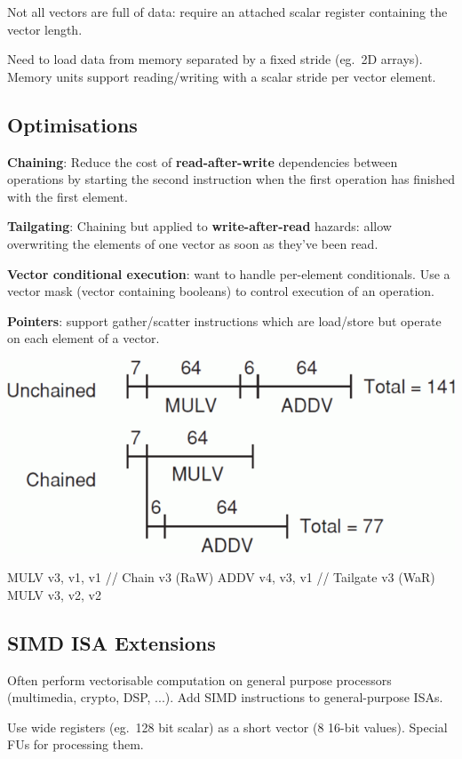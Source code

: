 \documentclass[a4paper, 11pt]{article}
\begin{document}
{{        Not all vectors are full of data: require an attached scalar register containing the vector length.

        Need to load data from memory separated by a fixed stride (eg.\ 2D arrays). Memory units support reading/writing with a scalar stride per vector element.
    }
    \subsection*{Optimisations}
    {
        \begin{minipage}[t]{0.6\textwidth}
        \textbf{Chaining}: Reduce the cost of \textbf{read-after-write} dependencies between operations by starting the second instruction when the first operation has finished with the first element.

        \textbf{Tailgating}: Chaining but applied to \textbf{write-after-read} hazards: allow overwriting the elements of one vector as soon as they've been read.

        \textbf{Vector conditional execution}: want to handle per-element conditionals. Use a vector mask (vector containing booleans) to control execution of an operation.

        \textbf{Pointers}: support gather/scatter instructions which are load/store but operate on each element of a vector.
        \end{minipage}
        \hspace{5mm}
        \begin{minipage}[t]{0.35\textwidth}
        \vspace{0pt}
        \centering
        \includegraphics[width=\textwidth]{vector-chaining.png}
        \begin{monospacefigure}
        MULV v3, v1, v1
        // Chain v3 (RaW)
        ADDV v4, v3, v1
        // Tailgate v3 (WaR)
        MULV v3, v2, v2
        \end{monospacefigure}
        \end{minipage}
    }
    \subsection*{SIMD ISA Extensions}
    {
        Often perform vectorisable computation on general purpose processors (multimedia, crypto, DSP, ...). Add SIMD instructions to general-purpose ISAs.

        Use wide registers (eg.\ 128 bit scalar) as a short vector (8 16-bit values). Special FUs for processing them.
    }
}
\end{document}
